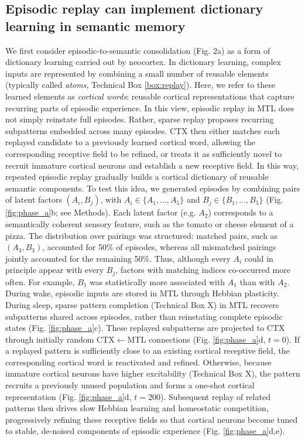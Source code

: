 \documentclass{article}
\begin{document}
\subsection*{Episodic replay can implement dictionary learning in semantic memory}
We first consider episodic-to-semantic consolidation (Fig. 2a) as a form of dictionary learning carried out by neocortex. In dictionary learning, complex inputs are represented by combining a small number of reusable elements (typically called \textit{atoms}, Technical Box \ref{box:replay}). Here, we refer to these learned elements as \textit{cortical words}: reusable cortical representations that capture recurring parts of episodic experience. In this view, episodic replay in MTL does not simply reinstate full episodes. Rather, sparse replay proposes recurring subpatterns embedded across many episodes. CTX then either matches each replayed candidate to a previously learned cortical word, allowing the corresponding receptive field to be refined, or treats it as sufficiently novel to recruit immature cortical neurons and establish a new receptive field. In this way, repeated episodic replay gradually builds a cortical dictionary of reusable semantic components.
\newline\newline
To test this idea, we generated episodes by combining pairs of latent factors $(A_i,B_j)$, with $A_i \in \{A_1,\dots,A_5\}$ and $B_j \in \{B_1,\dots,B_5\}$ (Fig. \ref{fig:phase_a}b; see Methods). Each latent factor (e.g. $A_2$) corresponds to a semantically coherent sensory feature, such as the tomato or cheese element of a pizza. The distribution over pairings was structured: matched pairs, such as $(A_3,B_3)$, accounted for 50\% of episodes, whereas all mismatched pairings jointly accounted for the remaining 50\%. Thus, although every $A_i$ could in principle appear with every $B_j$, factors with matching indices co-occurred more often. For example, $B_1$ was statistically more associated with $A_1$ than with $A_2$.
\newline\newline
During wake, episodic inputs are stored in MTL through Hebbian plasticity. During sleep, sparse pattern completion (Technical Box X) in MTL recovers subpatterns shared across episodes, rather than reinstating complete episodic states (Fig. \ref{fig:phase_a}c). These replayed subpatterns are projected to CTX through initially random CTX$\leftarrow$MTL connections (Fig. \ref{fig:phase_a}d, $t=0$). If a replayed pattern is sufficiently close to an existing cortical receptive field, the corresponding cortical word is reactivated and refined. Otherwise, because immature cortical neurons have higher excitability (Technical Box X), the pattern recruits a previously unused population and forms a one-shot cortical representation (Fig. \ref{fig:phase_a}d, $t=200$). Subsequent replay of related patterns then drives slow Hebbian learning and homeostatic competition, progressively refining these receptive fields so that cortical neurons become tuned to stable, de-noised components of episodic experience (Fig. \ref{fig:phase_a}d,e).
\end{document}
